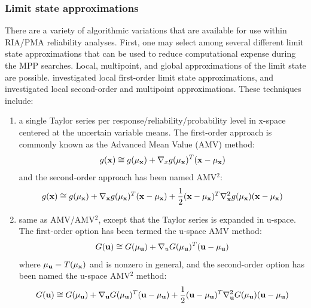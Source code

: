 \subsubsection{Limit state approximations} \label{uq:reliability:mpp:approx}

There are a variety of algorithmic variations that are available for
use within RIA/PMA reliability analyses.  First, one may select among
several different limit state approximations that can be used to
reduce computational expense during the MPP searches.  Local,
multipoint, and global approximations of the limit state are possible.
\cite{Eld05} investigated local first-order limit state 
approximations, and \cite{Eld06a} investigated local second-order
and multipoint approximations.  These techniques include:

\begin{enumerate}
\item a single Taylor series per response/reliability/probability level 
in x-space centered at the uncertain variable means.  The first-order 
approach is commonly known as the Advanced Mean Value (AMV) method:
\begin{equation}
g({\bf x}) \cong g(\mu_{\bf x}) + \nabla_x g(\mu_{\bf x})^T 
({\bf x} - \mu_{\bf x}) \label{eq:linear_x_mean}
\end{equation}
and the second-order approach has been named AMV$^2$:
\begin{equation}
g({\bf x}) \cong g(\mu_{\bf x}) + \nabla_{\bf x} g(\mu_{\bf x})^T 
({\bf x} - \mu_{\bf x}) + \frac{1}{2} ({\bf x} - \mu_{\bf x})^T 
\nabla^2_{\bf x} g(\mu_{\bf x}) ({\bf x} - \mu_{\bf x})
\label{eq:taylor2_x_mean}
\end{equation}

\item same as AMV/AMV$^2$, except that the Taylor series is expanded 
in u-space.  The first-order option has been termed the u-space AMV 
method:
\begin{equation}
G({\bf u}) \cong G(\mu_{\bf u}) + \nabla_u G(\mu_{\bf u})^T 
({\bf u} - \mu_{\bf u}) \label{eq:linear_u_mean}
\end{equation}
where $\mu_{\bf u} = T(\mu_{\bf x})$ and is nonzero in general, and 
the second-order option has been named the u-space AMV$^2$ method:
\begin{equation}
G({\bf u}) \cong G(\mu_{\bf u}) + \nabla_{\bf u} G(\mu_{\bf u})^T 
({\bf u} - \mu_{\bf u}) + \frac{1}{2} ({\bf u} - \mu_{\bf u})^T 
\nabla^2_{\bf u} G(\mu_{\bf u}) ({\bf u} - \mu_{\bf u}) 
\label{eq:taylor2_u_mean}
\end{equation}


\end{enumerate}
